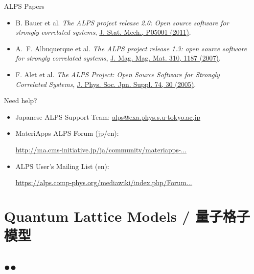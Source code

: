 \begin{frame}{ALPS Papers}
  \begin{itemize}
    \setlength{\itemsep}{1em}
  \item B. Bauer et al. {\it The ALPS project release 2.0: Open source software for strongly correlated systems}, \href{http://iopscience.iop.org/1742-5468/2011/05/P05001}{J. Stat. Mech., P05001 (2011)}.
  \item A.~F. Albuquerque et al. {\it The ALPS project release 1.3: open source software for strongly correlated systems}, \href{http://dx.doi.org/10.1016/j.jmmm.2006.10.304}{J. Mag. Mag. Mat. 310, 1187 (2007)}.
  \item F. Alet et al. {\it The ALPS Project: Open Source Software for
      Strongly Correlated Systems}, \href{http://jpsj.ipap.jp/link?JPSJS/74S/30}{J. Phys. Soc. Jpn. Suppl. 74, 30 (2005)}.
  \end{itemize}
\end{frame}

\begin{frame}{Need help?}
  \begin{itemize}
    \setlength{\itemsep}{1em}
  \item Japanese ALPS Support Team: {\footnotesize \href{mailto:alps@exa.phys.s.u-tokyo.ac.jp}{alps@exa.phys.s.u-tokyo.ac.jp}}
  \item MateriApps ALPS Forum (jp/en):

    {\footnotesize \href{http://ma.cms-initiative.jp/ja/community/materiapps-messageboard/alps}{http://ma.cms-initiative.jp/ja/community/materiapps-...}}
  \item ALPS User's Mailing List (en):

    {\footnotesize \href{https://alps.comp-phys.org/mediawiki/index.php/Forum:Overview}{https://alps.comp-phys.org/mediawiki/index.php/Forum...}}
  \end{itemize}
\end{frame}

\section{Quantum Lattice Models / 量子格子模型}
\subsection*{{\protect\color{red}●}{\protect\color{blue}●}}

